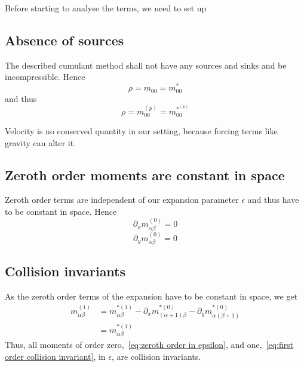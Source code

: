 
Before starting to analyse the terms, we need to set up
\subsection{Absence of sources}
\label{sub:Absence of sources}
The described cumulant method shall not have any sources and sinks and be incompressible. Hence
\begin{equation}
    \rho  = m_{00} = m_{00}^*
\end{equation}
and thus
\begin{equation}
    \rho = m_{00}^{(p)} = m_{00}^{*^{(p)}}
\end{equation}

Velocity is no conserved quantity in our setting, because forcing terms like gravity can alter it.

\subsection{Zeroth order moments are constant in space}
\label{sub:Zeroth order moments are constant in space}
Zeroth order terms are independent of our expansion parameter $\epsilon$ and thus have to be constant in space. Hence
\begin{equation}
  \partial_x m_{\alpha\beta}^{(0)} = 0
\end{equation}
\begin{equation}
  \partial_y m_{\alpha\beta}^{(0)} = 0
\end{equation}


\subsection{Collision invariants}
\label{sub:Collision invariants}
As the zeroth order terms of the expansion have to be constant in space, we get
\begin{equation}
  \label{eq:first order collision invariant}
  \begin{aligned}
    m_{\alpha\beta}^{(1)}
    & = m_{\alpha\beta}^{*(1)}
    - \partial_x m_{(\alpha+1)\beta}^{*(0)}
    - \partial_y m_{\alpha(\beta+1)}^{*(0)} \\
    & = m_{\alpha\beta}^{*(1)}
  \end{aligned}
\end{equation}
Thus, all moments of order zero,~\eqref{eq:zeroth order in epsilon},
and one,~\eqref{eq:first order collision invariant}, in $\epsilon$, are collision invariants.

